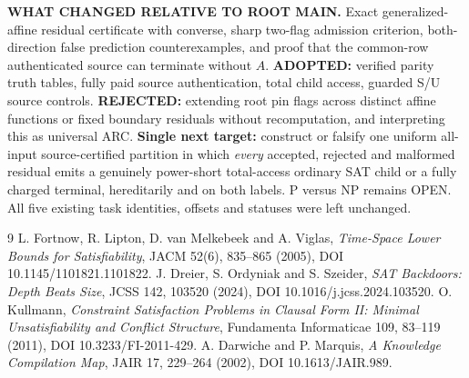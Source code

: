\documentclass[11pt]{article}
\begin{document}
\noindent\textbf{WHAT CHANGED RELATIVE TO ROOT MAIN.} Exact generalized-affine residual certificate with converse, sharp two-flag admission criterion, both-direction false prediction counterexamples, and proof that the common-row authenticated source can terminate without $A$. \textbf{ADOPTED:} verified parity truth tables, fully paid source authentication, total child access, guarded S/U source controls. \textbf{REJECTED:} extending root pin flags across distinct affine functions or fixed boundary residuals without recomputation, and interpreting this as universal ARC. \textbf{Single next target:} construct or falsify one uniform all-input source-certified partition in which \emph{every} accepted, rejected and malformed residual emits a genuinely power-short total-access ordinary SAT child or a fully charged terminal, hereditarily and on both labels. P versus NP remains OPEN. All five existing task identities, offsets and statuses were left unchanged.

\begin{thebibliography}{9}
 L. Fortnow, R. Lipton, D. van Melkebeek and A. Viglas, \emph{Time-Space Lower Bounds for Satisfiability}, JACM 52(6), 835--865 (2005), DOI 10.1145/1101821.1101822.
 J. Dreier, S. Ordyniak and S. Szeider, \emph{SAT Backdoors: Depth Beats Size}, JCSS 142, 103520 (2024), DOI 10.1016/j.jcss.2024.103520.
 O. Kullmann, \emph{Constraint Satisfaction Problems in Clausal Form II: Minimal Unsatisfiability and Conflict Structure}, Fundamenta Informaticae 109, 83--119 (2011), DOI 10.3233/FI-2011-429.
 A. Darwiche and P. Marquis, \emph{A Knowledge Compilation Map}, JAIR 17, 229--264 (2002), DOI 10.1613/JAIR.989.
\end{thebibliography}
\end{document}
